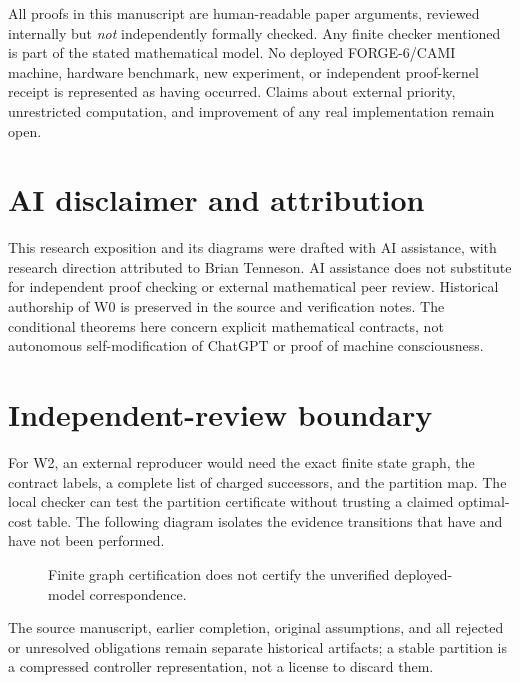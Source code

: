 \documentclass[11pt,letterpaper]{article}
\theoremstyle{definition}
\theoremstyle{remark}
\begin{document}
All proofs in this manuscript are human-readable paper arguments, reviewed internally but \emph{not} independently formally checked. Any finite checker mentioned is part of the stated mathematical model. No deployed FORGE-6/CAMI machine, hardware benchmark, new experiment, or independent proof-kernel receipt is represented as having occurred. Claims about external priority, unrestricted computation, and improvement of any real implementation remain open.

\section*{AI disclaimer and attribution}
This research exposition and its diagrams were drafted with AI assistance, with research direction attributed to Brian Tenneson. AI assistance does not substitute for independent proof checking or external mathematical peer review. Historical authorship of W0 is preserved in the source and verification notes. The conditional theorems here concern explicit mathematical contracts, not autonomous self-modification of ChatGPT or proof of machine consciousness.

\section*{Independent-review boundary}
For W2, an external reproducer would need the exact finite state graph, the contract labels, a complete list of charged successors, and the partition map. The local checker can test the partition certificate without trusting a claimed optimal-cost table. The following diagram isolates the evidence transitions that have and have not been performed.
\begin{figure}[ht]\centering{}\caption{Finite graph certification does not certify the unverified deployed-model correspondence.}\end{figure}
The source manuscript, earlier completion, original assumptions, and all rejected or unresolved obligations remain separate historical artifacts; a stable partition is a compressed controller representation, not a license to discard them.
\end{document}
